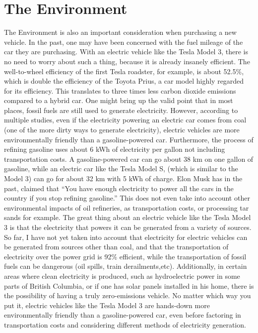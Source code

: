 \documentclass{article}
\begin{document}
  \section{The Environment}
  The Environment is also an important consideration when purchasing a new vehicle.
  In the past, one may have been concerned with the fuel mileage of the car they are purchasing.
  With an electric vehicle like the Tesla Model 3, there is no need to worry about such a thing,
  because it is already insanely efficient. The well-to-wheel efficiency of the first Tesla roadster,
  for example, is about 52.5\%, which is double the efficiency of the Toyota Prius\cite{eberhard200621},
  a car model highly regarded for its efficiency. This translates to three times less carbon dioxide
  emissions compared to a hybrid car.\cite{eberhard200621} One might bring up the valid point that
  in most places, fossil fuels are still used to generate electricity. However, according to multiple
  studies, even if the electricity powering an electric car comes from coal
  (one of the more dirty ways to generate electricity),
  electric vehicles are more environmentally friendly than a gasoline-powered car.\cite{cleanerevenwithcoal}
  Furthermore, the process of refining gasoline uses about 6 kWh of electricity per gallon not including transportation costs.
  A gasoline-powered car can go about 38 km on one gallon of gasoline, while an electric car like the Tesla Model S,
  (which is similar to the Model 3) can go for about 32 km with 5 kWh of charge. Elon Musk has
  in the past, claimed that ``You have enough electricity to power all the cars
  in the country if you stop refining gasoline.''\cite{rosoff_elon_nodate}
  This does not even take into account other environmental impacts of oil refineries,
  as transportation costs, or processing tar sands for example.\cite{6kwh}
  The great thing about an electric vehicle like the Tesla Model 3 is that
  the electricity that powers it can be generated from a variety of sources.\cite{eberhard200621}
  So far, I have not yet taken into account that electricity for electric vehicles can be generated
  from sources other than coal, and that the transportation of electricity over the power grid is
  92\% efficient\cite{eberhard200621}, while the transportation of fossil fuels
  can be dangerous (oil spills, train derailments,etc). Additionally, in certain areas where clean electricity is produced, such
  as hydroelectric power in some parts of British Columbia, or if one has solar
  panels installed in his home, there is the possibility of having a truly zero-emissions vehicle.
  No matter which way you put it, electric vehicles like the Tesla Model 3 are hands-down
  more environmentally friendly than a gasoline-powered car, even before factoring in transportation
  costs and considering different methods of electricity generation.
\end{document}
